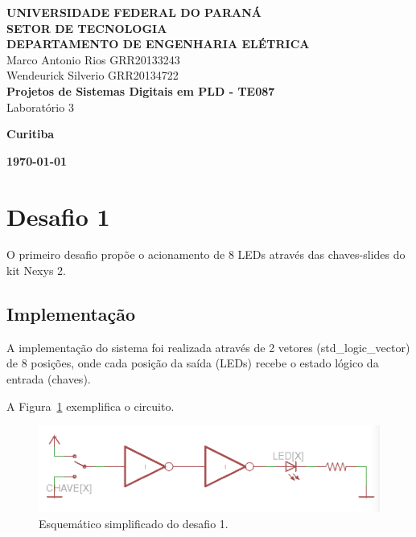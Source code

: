 \documentclass[12pt]{article}
\begin{document}
    
\begin{titlepage}
 \vfill
  \begin{center}
   {\large \textbf{UNIVERSIDADE FEDERAL DO PARANÁ \\ SETOR DE TECNOLOGIA \\ DEPARTAMENTO DE ENGENHARIA ELÉTRICA}} \\[5cm]

  {\large {Marco Antonio Rios  GRR20133243 \\ Wendeurick Silverio GRR20134722} }\\[4cm]


   {\Large \textbf{Projetos de Sistemas Digitais em PLD - TE087} \\ Laboratório 3}\\[6cm]
    \vfill

    \vspace{2cm}

    \large \textbf{Curitiba}

    \large \textbf{\today}

      \end{center}
\end{titlepage}

\clearpage

\section{Desafio 1}

O primeiro desafio propõe o acionamento de 8 LEDs através das chaves-slides do kit Nexys 2.

\subsection{Implementação}

A implementação do sistema foi realizada através de 2 vetores (std\_logic\_vector) de 8 posições, onde cada posição da saída (LEDs) recebe o estado lógico da entrada (chaves).

A Figura~\ref{fig:desafio1_sch} exemplifica o circuito.

\begin{figure}[!h]
    \centering
    \includegraphics[width=1\textwidth]{desafio1_sch.png}
    \caption{Esquemático simplificado do desafio 1.}
    \label{fig:desafio1_sch}
\end{figure}
\end{document}

